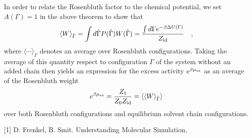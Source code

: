 \documentclass[12pt]{article} %
\newcommand\chain{\Gamma}
\newcommand\delU{\Delta U}
\newcommand\Ztot{Z_{1}}
\newcommand\Zsystem{Z_{0}}
\newcommand\Zid{Z_{\rm id}}
\newcommand\muex{\mu_{\rm ex}}
\newcommand\rconfig{\tilde{\chain}}
\begin{document}
In order to relate the Rosenbluth factor to the chemical potential, we set $A(\Gamma)=1$
in the above theorem to show that
\begin{equation}
    \langle W \rangle_{\rconfig} = \int d\rconfig P(\rconfig)W(\rconfig) = 
    \frac{\int d\chain e^{-\beta\delU(\chain)}}{\Zid} 
    \quad,
\end{equation}
where $\langle \cdots \rangle_{\rconfig}$ denotes an average over Rosenbluth configurations.
Taking the average of this quantity respect to configuration $\Gamma$ of the system without 
an added chain then yields an expression for the excess activity $e^{\beta\muex}$ as an 
average of the Rosenbluth weight
\begin{equation}
   e^{\beta \muex} = 
   \frac{\Ztot}{\Zsystem\Zid} = 
   \langle \langle W \rangle_{\rconfig} \rangle
\end{equation}
over both Rosenbluth configurations and equilibrium solvent chain configurations. 


\begin{thebibliography}{99} %

[1] D. Frenkel, B. Smit. Understanding Molecular Simulation. 
 
\end{thebibliography}

\end{document}
